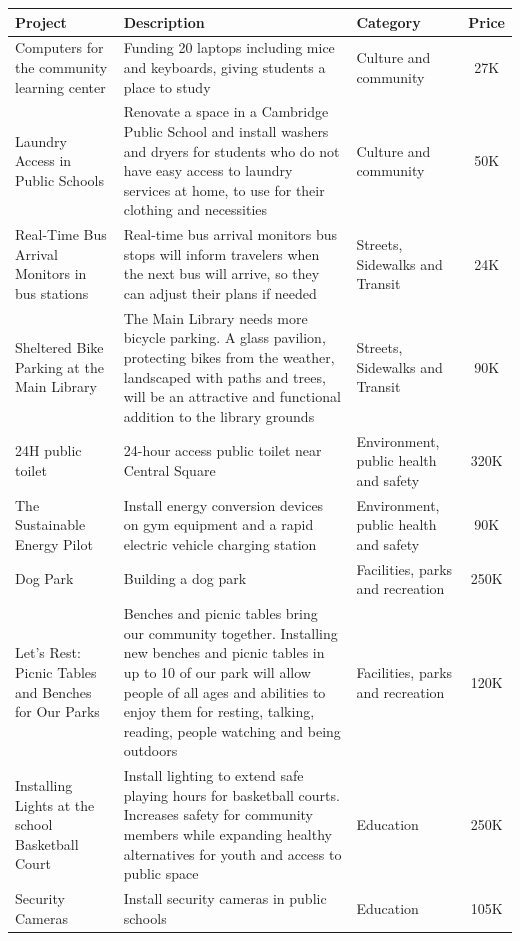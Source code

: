 \documentclass[10pt]{article}
\begin{document}
\begin{appendices}
\begin{table}[ht!]
  \begin{center}
    \begin{tabular}{|p{4cm}|p{8cm}|p{3cm}|c|}
    \hline
    \textbf{Project} & \textbf{Description} & \textbf{Category} & \textbf{Price}\\
    \hline
    Computers for the community learning center & Funding 20 laptops including mice and keyboards, giving students a place to study & Culture and community &  27K\\
    \hline
    Laundry Access in Public Schools & Renovate a space in a Cambridge Public School and install washers and dryers for students who do not have easy access to laundry services at home, to use for their clothing and necessities & Culture and community & 50K\\
    \hline
    Real-Time Bus Arrival Monitors in bus stations & Real-time bus arrival monitors bus stops will inform travelers when the next bus will arrive, so they can adjust their plans if needed &  Streets, Sidewalks and Transit &  24K\\
    \hline
    Sheltered Bike Parking at the Main Library & The Main Library needs more bicycle parking. A glass pavilion, protecting bikes from the weather, landscaped with paths and trees, will be an attractive and functional addition to the library grounds & Streets, Sidewalks and Transit & 90K\\
    \hline
    24H public toilet & 24-hour access public toilet near Central Square & Environment, public health and safety & 320K\\
    \hline
    The Sustainable Energy Pilot & Install energy conversion devices on gym equipment and a rapid electric vehicle charging station & Environment, public health and safety & 90K\\
    \hline
    Dog Park & Building a dog park & Facilities, parks and recreation & 250K\\
    \hline
    Let’s Rest: Picnic Tables and Benches for Our Parks & Benches and picnic tables bring our community together. Installing new benches and picnic tables in up to 10 of our park will allow people of all ages and abilities to enjoy them for resting, talking, reading, people watching and being outdoors & Facilities, parks and recreation & 120K\\
    \hline
    Installing Lights at the school Basketball Court & Install lighting to extend safe playing hours for basketball courts. Increases safety for community members while expanding healthy alternatives for youth and access to public space & Education & 250K\\
    \hline
    Security Cameras & Install security cameras in public schools & Education & 105K\\
        

\end{tabular}
\end{center}
\end{table}
\end{appendices}
\end{document}
